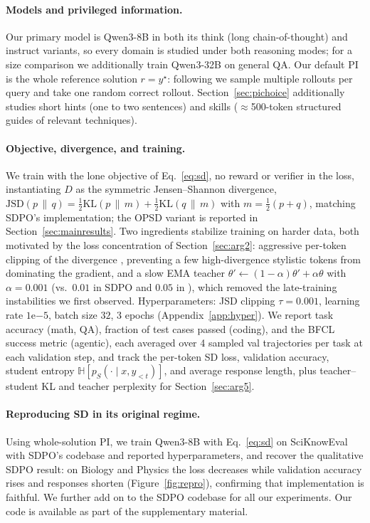\documentclass{article}
\newcommand{\ysol}{y^{\star}}               %
\newcommand{\JSD}{\mathrm{JSD}}             %
\newcommand{\KL}{\mathrm{KL}}
\begin{document}
\paragraph{Models and privileged information.}
Our primary model is Qwen3-8B \citep{qwen32025} in both its think (long chain-of-thought) and instruct variants, so every domain is studied under both reasoning modes; for a size comparison we additionally train Qwen3-32B on general QA. Our default PI is the whole reference solution $r=\ysol$: following \citet{sdpo2025} we sample multiple rollouts per query and take one random correct rollout. Section~\ref{sec:pichoice} additionally studies short hints (one to two sentences) and skills ($\approx$500-token structured guides of relevant techniques).


\paragraph{Objective, divergence, and training.}
We train with the lone objective of Eq.~\eqref{eq:sd}, no reward or verifier in the loss, instantiating $D$ as the symmetric Jensen--Shannon divergence, $\JSD(p\,\|\,q)=\tfrac12\KL(p\,\|\,m)+\tfrac12\KL(q\,\|\,m)$ with $m=\tfrac12(p+q)$, matching SDPO's implementation; the OPSD variant is reported in Section~\ref{sec:mainresults}. Two ingredients stabilize training on harder data, both motivated by the loss concentration of Section~\ref{sec:arg2}: aggressive per-token clipping of the divergence \citep{opsd2025}, preventing a few high-divergence stylistic tokens from dominating the gradient, and a slow EMA teacher $\theta'\leftarrow(1-\alpha)\theta'+\alpha\theta$ with $\alpha{=}0.001$ (vs.\ $0.01$ in SDPO and $0.05$ in \citet{reasoning_degrades2025}), which removed the late-training instabilities we first observed. Hyperparameters: JSD clipping $\tau{=}0.001$, learning rate $1\mathrm{e}{-5}$, batch size $32$, $3$ epochs (Appendix~\ref{app:hyper}). We report task accuracy (math, QA), fraction of test cases passed (coding), and the BFCL success metric (agentic), each averaged over 4 sampled val trajectories per task at each validation step, and track the per-token SD loss, validation accuracy, student entropy $\mathbb{H}[p_S(\cdot\mid x,\hat y_{<t})]$, and average response length, plus teacher--student KL and teacher perplexity for Section~\ref{sec:arg5}.


\paragraph{Reproducing SD in its original regime.}
Using whole-solution PI, we train Qwen3-8B with Eq.~\eqref{eq:sd} on SciKnowEval with SDPO's codebase \citep{sdpo2025} and reported hyperparameters, and recover the qualitative SDPO result: on Biology and Physics the loss decreases while validation accuracy rises and responses shorten (Figure~\ref{fig:repro}), confirming that implementation is faithful. We further add on to the SDPO codebase for all our experiments. Our code is available as part of the supplementary material.
\end{document}
